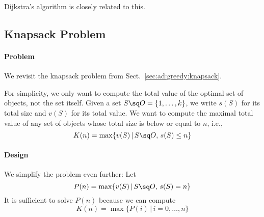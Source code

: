 Dijkstra's algorithm is closely related to this.

%
%
%
%
%

\subsection{Knapsack Problem}\label{sec:ad:dynamic:knapsack}

\paragraph{Problem}
We revisit the knapsack problem from Sect.~\ref{sec:ad:greedy:knapsack}.

For simplicity, we only want to compute the total value of the optimal set of objects, not the set itself.
Given a set $S\sq O=\{1,\ldots,k\}$, we write $s(S)$ for its total size and $v(S)$ for its total value.
We want to compute the maximal total value of any set of objects whose total size is below or equal to $n$, i.e.,
\[K(n)=\max \{v(S) \,|\, S\sq O,\,s(S)\leq n\}\]

\paragraph{Design}
We simplify the problem even further: Let
\[P(n)=\max \{v(S) \,|\, S\sq O,\,s(S) = n\}\]
It is sufficient to solve $P(n)$ because we can compute
\[K(n)=\max \{P(i)\,|\,i=0,\ldots,n\}\]

